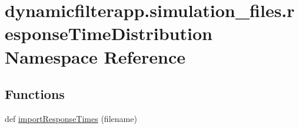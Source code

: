 \hypertarget{namespacedynamicfilterapp_1_1simulation__files_1_1response_time_distribution}{}\section{dynamicfilterapp.\+simulation\+\_\+files.\+response\+Time\+Distribution Namespace Reference}
\label{namespacedynamicfilterapp_1_1simulation__files_1_1response_time_distribution}
\subsection*{Functions}
\begin{DoxyCompactItemize}
\item 
def \mbox{\hyperlink{namespacedynamicfilterapp_1_1simulation__files_1_1response_time_distribution_ae93872086b32d303395dd0b753af1775}{import\+Response\+Times}} (filename)
\end{DoxyCompactItemize}
